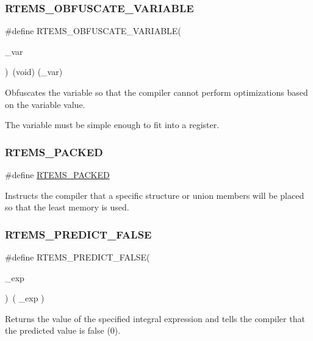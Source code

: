 \subsubsection{\texorpdfstring{RTEMS\_OBFUSCATE\_VARIABLE}{RTEMS\_OBFUSCATE\_VARIABLE}}
{\footnotesize\ttfamily \#define R\+T\+E\+M\+S\+\_\+\+O\+B\+F\+U\+S\+C\+A\+T\+E\+\_\+\+V\+A\+R\+I\+A\+B\+LE(\begin{DoxyParamCaption}\item[{}]{\+\_\+var }\end{DoxyParamCaption})~(void) (\+\_\+var)}



Obfuscates the variable so that the compiler cannot perform optimizations based on the variable value. 

The variable must be simple enough to fit into a register. \mbox{\label{group__RTEMSScoreBaseDefs_ga90b1bcc9c6d1a566ce5173321abfe1e2}} 
\subsubsection{\texorpdfstring{RTEMS\_PACKED}{RTEMS\_PACKED}}
{\footnotesize\ttfamily \#define \mbox{\hyperlink{structRTEMS__PACKED}{R\+T\+E\+M\+S\+\_\+\+P\+A\+C\+K\+ED}}}

Instructs the compiler that a specific structure or union members will be placed so that the least memory is used. \mbox{\label{group__RTEMSScoreBaseDefs_ga5cc847904bc4f2755ce665a20adb4b2c}} 
\subsubsection{\texorpdfstring{RTEMS\_PREDICT\_FALSE}{RTEMS\_PREDICT\_FALSE}}
{\footnotesize\ttfamily \#define R\+T\+E\+M\+S\+\_\+\+P\+R\+E\+D\+I\+C\+T\+\_\+\+F\+A\+L\+SE(\begin{DoxyParamCaption}\item[{}]{\+\_\+exp }\end{DoxyParamCaption})~( \+\_\+exp )}



Returns the value of the specified integral expression and tells the compiler that the predicted value is false (0). 


